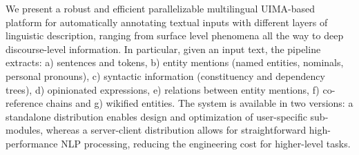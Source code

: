 We present a robust and efficient parallelizable multilingual UIMA-based platform for automatically annotating textual inputs with different layers of linguistic description, ranging from surface level phenomena all the way to deep discourse-level information. In particular, given an input text, the pipeline extracts: a) sentences and tokens, b) entity mentions (named entities, nominals, personal pronouns), c) syntactic information (constituency and dependency trees), d) opinionated expressions, e) relations between entity mentions, f) co-reference chains and g) wikified entities. The system is available in two versions: a standalone distribution enables design and optimization of user-specific sub-modules, whereas a server-client distribution allows for straightforward high-performance NLP processing, reducing the engineering cost for higher-level tasks.
